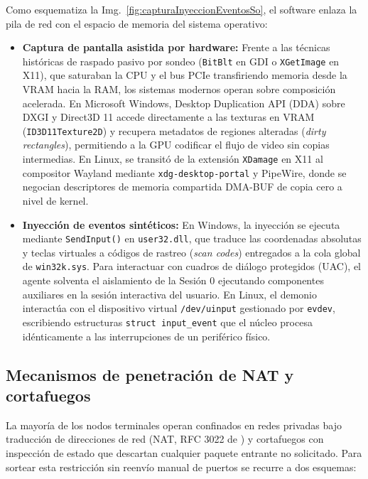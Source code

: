 \documentclass[12pt]{article}
\begin{document}
Como esquematiza la Img.~\ref{fig:capturaInyeccionEventosSo}, el software enlaza la pila de red con el espacio de memoria del sistema operativo:
\begin{itemize}[noitemsep, topsep=4pt]
    \item \textbf{Captura de pantalla asistida por hardware:} Frente a las técnicas históricas de raspado pasivo por sondeo (\texttt{BitBlt} en GDI o \texttt{XGetImage} en X11), que saturaban la CPU y el bus PCIe transfiriendo memoria desde la VRAM hacia la RAM, los sistemas modernos operan sobre composición acelerada. En Microsoft Windows, Desktop Duplication API (DDA) sobre DXGI y Direct3D 11 accede directamente a las texturas en VRAM (\texttt{ID3D11Texture2D}) y recupera metadatos de regiones alteradas (\textit{dirty rectangles}), permitiendo a la GPU codificar el flujo de video sin copias intermedias. En Linux, se transitó de la extensión \texttt{XDamage} en X11 al compositor Wayland mediante \texttt{xdg-desktop-portal} y PipeWire, donde se negocian descriptores de memoria compartida DMA-BUF de copia cero a nivel de kernel.
    \item \textbf{Inyección de eventos sintéticos:} En Windows, la inyección se ejecuta mediante \texttt{SendInput()} en \texttt{user32.dll}, que traduce las coordenadas absolutas y teclas virtuales a códigos de rastreo (\textit{scan codes}) entregados a la cola global de \texttt{win32k.sys}. Para interactuar con cuadros de diálogo protegidos (UAC), el agente solventa el aislamiento de la Sesión 0 ejecutando componentes auxiliares en la sesión interactiva del usuario. En Linux, el demonio interactúa con el dispositivo virtual \texttt{/dev/uinput} gestionado por \texttt{evdev}, escribiendo estructuras \texttt{struct input\_event} que el núcleo procesa idénticamente a las interrupciones de un periférico físico.
\end{itemize}

\subsection{Mecanismos de penetración de NAT y cortafuegos}\label{sec:penetracionNat}

La mayoría de los nodos terminales operan confinados en redes privadas bajo traducción de direcciones de red (NAT, RFC 3022 de \textcite{rfc3022}) y cortafuegos con inspección de estado que descartan cualquier paquete entrante no solicitado. Para sortear esta restricción sin reenvío manual de puertos se recurre a dos esquemas:
\end{document}
